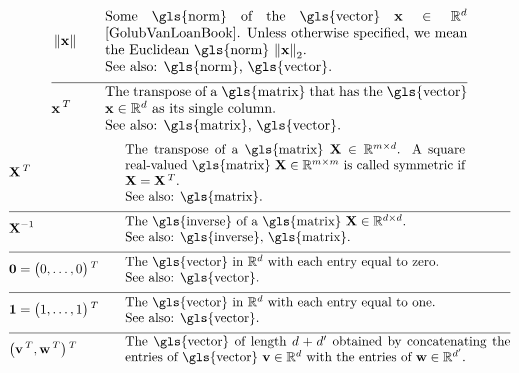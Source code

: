 \begin{align}
	&\normgeneric{\featurevec}{}  & \quad &  \parbox{.75\textwidth}{Some \gls{norm} of the \gls{vector} $\featurevec \in \mathbb{R}^{\featuredim}$ \cite{GolubVanLoanBook}. 
		Unless otherwise specified, we mean the Euclidean \gls{norm} $\normgeneric{\featurevec}{2}$.
		\\ See also: \gls{norm}, \gls{vector}. } \nonumber \\[2mm] \hline \nonumber\\[-5mm]
	&\featurevec\,^{T} &\quad & \parbox{.75\textwidth}{The transpose of a \gls{matrix} that has the \gls{vector} 
		$\featurevec \in \mathbb{R}^{\dimlocalmodel}$ as its single column.
		\\ See also: \gls{matrix}, \gls{vector}. } \nonumber 
\end{align} 
\newpage
\begin{align} 
	&\mathbf{X}\,^{T} &\quad & \parbox{.75\textwidth}{The transpose of a \gls{matrix} $\mathbf{X} \in \mathbb{R}^{\samplesize \times \featurelen}$. 
		A square real-valued \gls{matrix} $\mathbf{X} \in \mathbb{R}^{\samplesize \times \samplesize}$ 
		is called symmetric if $\mathbf{X} = \mathbf{X}\,^{T}$. 
		\\ See also: \gls{matrix}. }  \nonumber \\[2mm] \hline \nonumber\\[-5mm]
	&\mathbf{X}^{-1} &\quad & \parbox{.75\textwidth}{The \gls{inverse} of a \gls{matrix} $\mathbf{X} \in \mathbb{R}^{\featurelen \times \featurelen}$.
		\\ See also: \gls{inverse}, \gls{matrix}. }  \nonumber \\[2mm] \hline \nonumber\\[-5mm]
	&\mathbf{0}= \big(0, \ldots, 0\big)\,^{T}  & \quad &  \parbox{.75\textwidth}{The \gls{vector} in $\mathbb{R}^{\dimlocalmodel}$ with each entry equal to zero.
		\\ See also: \gls{vector}. } \nonumber \\[2mm] \hline \nonumber\\[-5mm]
	&\mathbf{1}= \big(1, \ldots, 1\big)\,^{T}  & \quad &  \parbox{.75\textwidth}{The \gls{vector} in $\mathbb{R}^{\dimlocalmodel}$ with each entry equal to one.
		\\ See also: \gls{vector}. } \nonumber \\[2mm] \hline \nonumber\\[-5mm]
	&\big(\vv\,^{T},\vw\,^{T} \big)\,^{T}  & \quad &  \parbox{.85\textwidth}{The \gls{vector} of length $\featurelen+\featurelen'$ 
		obtained by concatenating the entries of \gls{vector} $\vv \in \mathbb{R}^{\featurelen}$ with the entries of $\vw \in \mathbb{R}^{\featurelen'}$.
}
\end{align}
